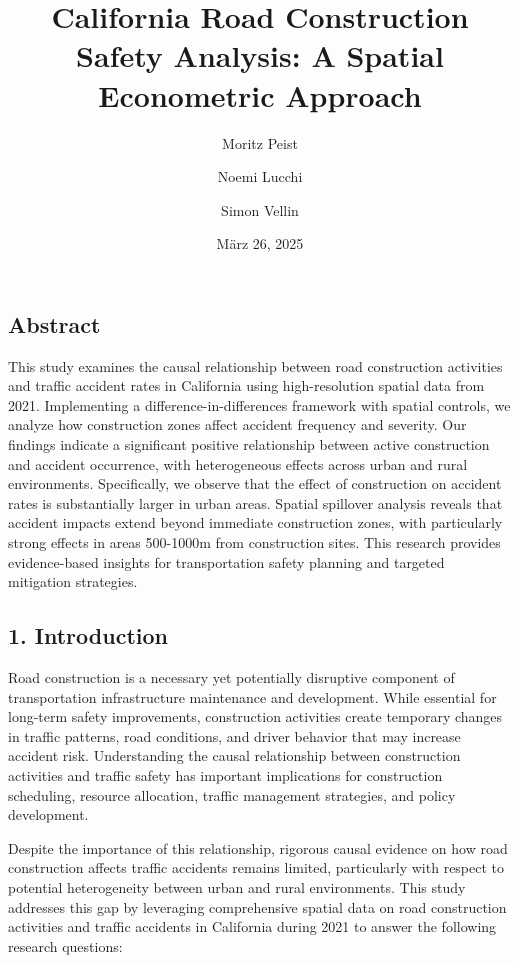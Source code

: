 \documentclass[
]{article}
\title{California Road Construction Safety Analysis: A Spatial
Econometric Approach}
\author{Moritz Peist \and Noemi Lucchi \and Simon Vellin}
\date{März 26, 2025}
\begin{document}
\maketitle

{
\setcounter{tocdepth}{3}
\tableofcontents
}
\subsection{Abstract}\label{abstract}

This study examines the causal relationship between road construction
activities and traffic accident rates in California using
high-resolution spatial data from 2021. Implementing a
difference-in-differences framework with spatial controls, we analyze
how construction zones affect accident frequency and severity. Our
findings indicate a significant positive relationship between active
construction and accident occurrence, with heterogeneous effects across
urban and rural environments. Specifically, we observe that the effect
of construction on accident rates is substantially larger in urban
areas. Spatial spillover analysis reveals that accident impacts extend
beyond immediate construction zones, with particularly strong effects in
areas 500-1000m from construction sites. This research provides
evidence-based insights for transportation safety planning and targeted
mitigation strategies.

\subsection{1. Introduction}\label{introduction}

Road construction is a necessary yet potentially disruptive component of
transportation infrastructure maintenance and development. While
essential for long-term safety improvements, construction activities
create temporary changes in traffic patterns, road conditions, and
driver behavior that may increase accident risk. Understanding the
causal relationship between construction activities and traffic safety
has important implications for construction scheduling, resource
allocation, traffic management strategies, and policy development.

Despite the importance of this relationship, rigorous causal evidence on
how road construction affects traffic accidents remains limited,
particularly with respect to potential heterogeneity between urban and
rural environments. This study addresses this gap by leveraging
comprehensive spatial data on road construction activities and traffic
accidents in California during 2021 to answer the following research
questions:
\end{document}
